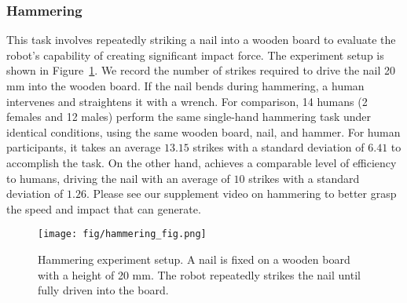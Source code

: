 
\begin{table}[hbt]
\centering
\caption{Snatching experiment results}
\label{tab:snatching_result}
\end{table}


\subsubsection{\textbf{Hammering}}
This task involves repeatedly striking a nail into a wooden board to evaluate the robot's capability of creating significant impact force. The experiment setup is shown in Figure~\ref{fig:hammering}. We record the number of strikes required to drive the nail 20 mm into the wooden board. If the nail bends during hammering, a human intervenes and straightens it with a wrench. For comparison, 14 humans (2 females and 12 males) perform the same single-hand hammering task under identical conditions, using the same wooden board, nail, and hammer. For human participants, it takes an average $13.15$ strikes with a standard deviation of $6.41$ to accomplish the task. On the other hand, \robot achieves a comparable level of efficiency to humans, driving the nail with an average of $10$ strikes with a standard deviation of $1.26$. Please see our supplement video on hammering to better grasp the speed and impact that \robot can generate.





\begin{figure}[hbt]
    \centering
    \texttt{[image: fig/hammering\_fig.png]}
    \caption{Hammering experiment setup. A nail is fixed on a wooden board with a height of 20 mm. The robot repeatedly strikes the nail until fully driven into the board.}
    \label{fig:hammering}
\end{figure}

